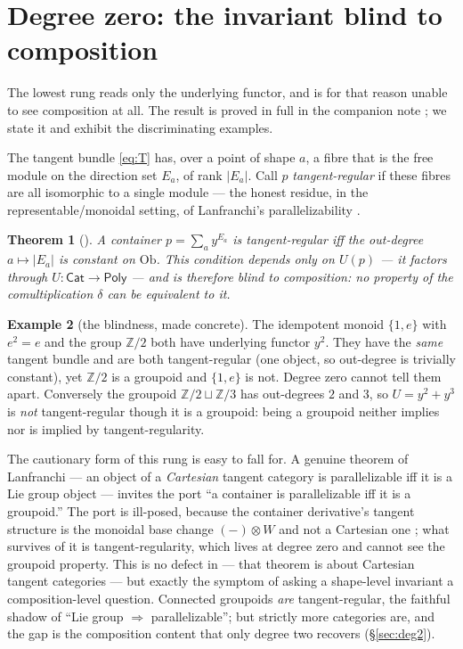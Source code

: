 \documentclass[11pt]{article}
\newtheorem{theorem}{Theorem}
\theoremstyle{definition}
\newtheorem{example}[theorem]{Example}
\newcommand{\Poly}{\mathsf{Poly}}
\newcommand{\Cat}{\mathsf{Cat}}
\newcommand{\Ob}{\mathrm{Ob}}
\newcommand{\Z}{\mathbb{Z}}
\begin{document}
\section{Degree zero: the invariant blind to composition}\label{sec:deg0}

The lowest rung reads only the underlying functor, and is for that reason unable to see composition
at all. The result is proved in full in the companion note \cite{MacBethParallel}; we state it and
exhibit the discriminating examples.

The tangent bundle \eqref{eq:T} has, over a point of shape $a$, a fibre that is the free module on
the direction set $E_a$, of rank $|E_a|$. Call $p$ \emph{tangent-regular} if these fibres are all
isomorphic to a single module --- the honest residue, in the representable/monoidal setting, of
Lanfranchi's parallelizability \cite{Lanfranchi2026,MacBethParallel}.

\begin{theorem}[\cite{MacBethParallel}]\label{thm:deg0}
A container $p=\sum_a y^{E_a}$ is tangent-regular iff the out-degree $a\mapsto|E_a|$ is constant on
$\Ob$. This condition depends only on $U(p)$ --- it factors through $U\colon\Cat\to\Poly$ --- and is
therefore blind to composition: no property of the comultiplication $\delta$ can be equivalent to
it.
\end{theorem}

\begin{example}[the blindness, made concrete]\label{ex:deg0}
The idempotent monoid $\{1,e\}$ with $e^2=e$ and the group $\Z/2$ both have underlying functor
$y^2$. They have the \emph{same} tangent bundle and are both tangent-regular (one object, so
out-degree is trivially constant), yet $\Z/2$ is a groupoid and $\{1,e\}$ is not. Degree zero
cannot tell them apart. Conversely the groupoid $\Z/2\sqcup\Z/3$ has out-degrees $2$ and $3$, so
$U=y^2+y^3$ is \emph{not} tangent-regular though it is a groupoid: being a groupoid neither implies
nor is implied by tangent-regularity.
\end{example}

The cautionary form of this rung is easy to fall for. A genuine theorem of Lanfranchi
\cite{Lanfranchi2026} --- an object of a \emph{Cartesian} tangent category is parallelizable iff it
is a Lie group object --- invites the port ``a container is parallelizable iff it is a groupoid.''
The port is ill-posed, because the container derivative's tangent structure is the monoidal base
change $(-)\otimes W$ and not a Cartesian one \cite{MacBethParallel}; what survives of it is
tangent-regularity, which lives at degree zero and cannot see the groupoid property. This is no
defect in \cite{Lanfranchi2026} --- that theorem is about Cartesian tangent categories --- but
exactly the symptom of asking a shape-level invariant a composition-level question. Connected
groupoids \emph{are} tangent-regular, the faithful shadow of ``Lie group $\Rightarrow$
parallelizable''; but strictly more categories are, and the gap is the composition content that
only degree two recovers (\S\ref{sec:deg2}).
\end{document}
